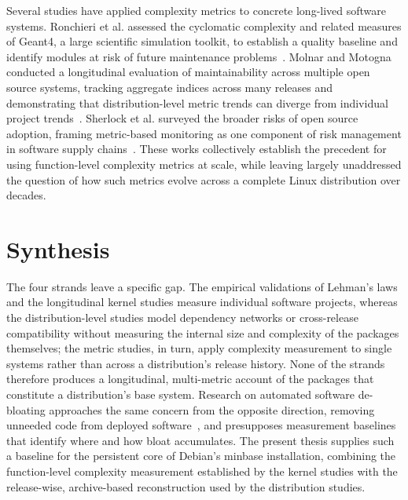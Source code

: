 Several studies have applied complexity metrics to concrete long-lived software systems. Ronchieri et al. assessed the cyclomatic complexity and related measures of Geant4, a large scientific simulation toolkit, to establish a quality baseline and identify modules at risk of future maintenance problems~\cite{ronchieri2016software}. Molnar and Motogna conducted a longitudinal evaluation of maintainability across multiple open source systems, tracking aggregate indices across many releases and demonstrating that distribution-level metric trends can diverge from individual project trends~\cite{molnar2020longitudinal}. Sherlock et al. surveyed the broader risks of open source adoption, framing metric-based monitoring as one component of risk management in software supply chains~\cite{Sherlock2018OpenSS}. These works collectively establish the precedent for using function-level complexity metrics at scale, while leaving largely unaddressed the question of how such metrics evolve across a complete Linux distribution over decades.

\section{Synthesis}
\label{sec:rw_synthesis}

The four strands leave a specific gap. The empirical validations of Lehman's laws and the longitudinal kernel studies measure individual software projects, whereas the distribution-level studies model dependency networks or cross-release compatibility without measuring the internal size and complexity of the packages themselves; the metric studies, in turn, apply complexity measurement to single systems rather than across a distribution's release history. None of the strands therefore produces a longitudinal, multi-metric account of the packages that constitute a distribution's base system. Research on automated software de-bloating approaches the same concern from the opposite direction, removing unneeded code from deployed software~\cite{quach2018debloating,brown2023sokdebloating}, and presupposes measurement baselines that identify where and how bloat accumulates. The present thesis supplies such a baseline for the persistent core of Debian's minbase installation, combining the function-level complexity measurement established by the kernel studies with the release-wise, archive-based reconstruction used by the distribution studies.
